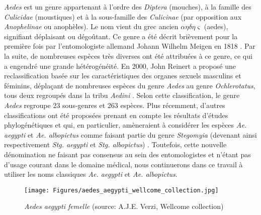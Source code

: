 {\em Aedes} est un genre appartenant à l'ordre des {\em Diptera} (mouches), à la famille des {\em Culicidae} (moustiques) et à la sous-famille des {\em Culicinae} (par opposition aux {\em Anophelinae} ou anophèles).
Le nom vient du grec ancien  $\alpha \eta \delta \eta \varsigma$ (aedes), signifiant \guillemotleft déplaisant\guillemotright \; ou \guillemotleft dégoûtant\guillemotright.
Ce genre a été décrit brièvement pour la première fois par l'entomologiste allemand Johann Wilhelm Meigen en 1818 \cite{meigen1818}.
Par la suite, de nombreuses espèces très diverses ont été attribuées à ce genre, ce qui a engendré une grande hétérogénéité.
En 2000, John Reinert a proposé une reclassification basée sur les caractéristiques des organes sexuels masculins et féminins, déplaçant de nombreuses espèces du genre {\em Aedes} au genre {\em Ochlerotatus}, tous deux regroupés dans la tribu {\em Aedini} \cite{reinert2000new}.
Selon cette classification, le genre {\em Aedes} regroupe 23 sous-genres et 263 espèces. 
Plus récemment, d'autres classifications ont été proposées prenant en compte les résultats d'études phylogénétiques et qui, en particulier, amèneraient à considérer les espèces {\em Ae. aegypti} et {\em Ae. albopictus} comme faisant partie du genre {\em Stegomyia} (devenant ainsi respectivement {\em Stg. aegypti} et {\em Stg. albopictus}) \cite{reinert2004phylogeny}.
Toutefois, cette nouvelle dénomination ne faisant pas consensus au sein des entomologistes \cite{polaszek2006two} et n'étant pas d'usage courant dans le domaine médical, nous continuerons dans ce travail à utiliser les noms classiques {\em Ae. aegypti} et {\em Ae. albopictus}.

\begin{figure}[t]
	\centering
	\texttt{[image: Figures/aedes\_aegypti\_wellcome\_collection.jpg]}
	\caption{{\em Aedes aegypti femelle} (source: A.J.E. Verzi, Wellcome collection)}
	\label{fig:aedesvexans}
\end{figure}

